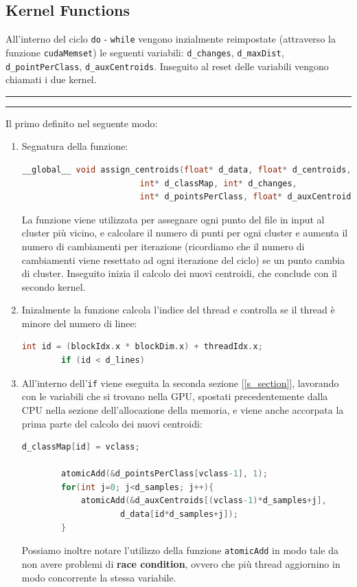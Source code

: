\documentclass{article}
\begin{document}
  \subsection{Kernel Functions}
  All'interno del ciclo \verb|do| - \verb|while| vengono inzialmente reimpostate (attraverso la funzione \verb|cudaMemset|) le seguenti variabili: \verb|d_changes|, \verb|d_maxDist|, \verb|d_pointPerClass|, \verb|d_auxCentroids|.
  Inseguito al reset delle variabili vengono chiamati i due kernel. 
  \begin{center}
    \rule{2.5cm}{1pt}  \rule{2.5cm}{1pt}
  \end{center}
  Il primo definito nel seguente modo:
  \begin{enumerate}
    \item Segnatura della funzione:
      \begin{lstlisting}[language=C, xleftmargin=-5em]
        __global__ void assign_centroids(float* d_data, float* d_centroids, 
                        int* d_classMap, int* d_changes, 
                        int* d_pointsPerClass, float* d_auxCentroids)
      \end{lstlisting}
      La funzione viene utilizzata per assegnare ogni punto del file in input al cluster più vicino, e calcolare il numero di punti per ogni cluster e aumenta 
      il numero di cambiamenti per iterazione (ricordiamo che il numero di cambiamenti viene resettato ad ogni iterazione del ciclo) se un punto cambia di cluster. Inseguito
      inizia il calcolo dei nuovi centroidi, che conclude con il secondo kernel.
    \item Inizalmente la funzione calcola l'indice del thread e controlla se il thread è minore del numero di linee:
      \begin{lstlisting}[language=C, xleftmargin=-5em]
        int id = (blockIdx.x * blockDim.x) + threadIdx.x;
        if (id < d_lines)
      \end{lstlisting}
    \item All'interno dell'\verb|if| viene eseguita la seconda sezione [\ref{s_section}], lavorando con le variabili che si trovano nella GPU, spostati precedentemente dalla CPU nella sezione 
      dell'allocazione della memoria, e viene anche accorpata la prima parte del calcolo dei nuovi centroidi:
      \begin{lstlisting}[language=C, xleftmargin=-5em]
        d_classMap[id] = vclass;

        atomicAdd(&d_pointsPerClass[vclass-1], 1);
        for(int j=0; j<d_samples; j++){
            atomicAdd(&d_auxCentroids[(vclass-1)*d_samples+j], 
                    d_data[id*d_samples+j]);
        }
      \end{lstlisting}
      Possiamo inoltre notare l'utilizzo della funzione \verb|atomicAdd| in modo tale da non avere problemi di \textbf{race condition}, ovvero che più thread aggiornino in modo concorrente la stessa variabile.
  \end{enumerate}
\end{document}
